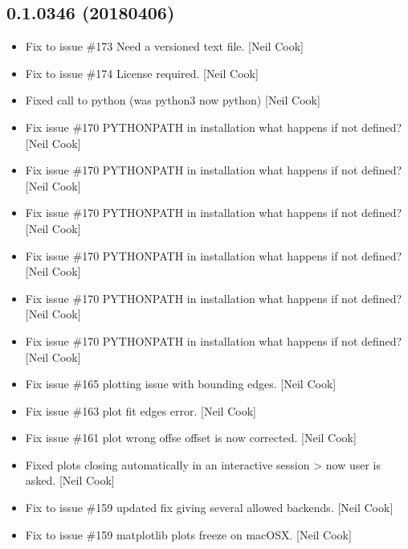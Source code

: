 \documentclass[a4paper,10pt,english]{report}
\begin{document}
\subsection{0.1.0346 (2018\sphinxhyphen{}04\sphinxhyphen{}06)}
\label{\detokenize{misc/changelog:id485}}\begin{itemize}
\item {} 
Fix to issue \#173 \sphinxhyphen{} Need a versioned text file. {[}Neil Cook{]}

\item {} 
Fix to issue \#174 \sphinxhyphen{} License required. {[}Neil Cook{]}

\item {} 
Fixed call to python (was python3 now python) {[}Neil Cook{]}

\item {} 
Fix issue \#170 \sphinxhyphen{} PYTHONPATH in installation \sphinxhyphen{} what happens if not
defined? {[}Neil Cook{]}

\item {} 
Fix issue \#170 \sphinxhyphen{} PYTHONPATH in installation \sphinxhyphen{} what happens if not
defined? {[}Neil Cook{]}

\item {} 
Fix issue \#170 \sphinxhyphen{} PYTHONPATH in installation \sphinxhyphen{} what happens if not
defined? {[}Neil Cook{]}

\item {} 
Fix issue \#170 \sphinxhyphen{} PYTHONPATH in installation \sphinxhyphen{} what happens if not
defined? {[}Neil Cook{]}

\item {} 
Fix issue \#170 \sphinxhyphen{} PYTHONPATH in installation \sphinxhyphen{} what happens if not
defined? {[}Neil Cook{]}

\item {} 
Fix issue \#170 \sphinxhyphen{} PYTHONPATH in installation \sphinxhyphen{} what happens if not
defined? {[}Neil Cook{]}

\item {} 
Fix issue \#165 \sphinxhyphen{}  plotting issue with bounding edges. {[}Neil
Cook{]}

\item {} 
Fix issue \#163 \sphinxhyphen{}  plot fit edges error. {[}Neil Cook{]}

\item {} 
Fix issue \#161 \sphinxhyphen{}  plot wrong offse \sphinxhyphen{} offset is now corrected.
{[}Neil Cook{]}

\item {} 
Fixed plots closing automatically in an interactive session \textendash{}\textgreater{} now
user is asked. {[}Neil Cook{]}

\item {} 
Fix to issue \#159 \sphinxhyphen{} updated fix giving several allowed backends. {[}Neil
Cook{]}

\item {} 
Fix to issue \#159 \sphinxhyphen{} matplotlib plots freeze on macOSX. {[}Neil Cook{]}

\end{itemize}
\end{document}
